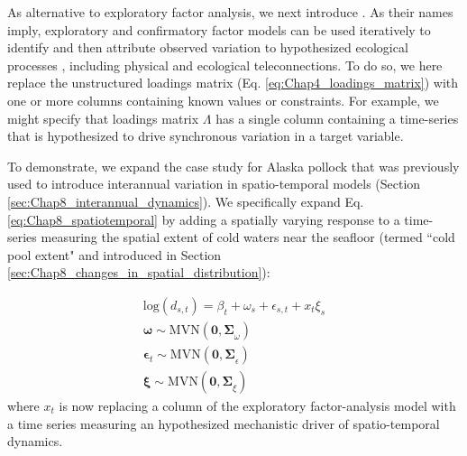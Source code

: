 As alternative to exploratory factor analysis, we next introduce .  As their names imply, exploratory and confirmatory factor models can be used iteratively to identify and then attribute observed variation to hypothesized ecological processes \cite{gruss_synthesis_2021,von_hardenberg_disentangling_2013}, including physical and ecological teleconnections.  To do so, we here replace the unstructured loadings matrix (Eq. \ref{eq:Chap4_loadings_matrix}) with one or more columns containing known values or constraints.  For example, we might specify that loadings matrix \( \Lambda \) has a single column containing a time-series that is hypothesized to drive synchronous variation in a target variable.  

To demonstrate, we expand the case study for Alaska pollock that was previously used to introduce interannual variation in spatio-temporal models (Section \ref{sec:Chap8_interannual_dynamics}). We specifically expand Eq. \ref{eq:Chap8_spatiotemporal} by adding a spatially varying response to a time-series measuring the spatial extent of cold waters near the seafloor (termed ``cold pool extent" and introduced in Section \ref{sec:Chap8_changes_in_spatial_distribution}): 

\begin{equation}
\begin{gathered} \label{eq:Chap9_confirmatory_factor_model}
  \mathrm{log}( d_{s,t} ) = \beta_t + \omega_s + \epsilon_{s,t} + x_t \xi_s \\
  \mathbf{\omega} \sim \mathrm{MVN}( \mathbf{0, \Sigma}_{\omega} ) \\
  \mathbf{\epsilon}_t \sim \mathrm{MVN}( \mathbf{0, \Sigma}_{\epsilon} ) \\
  \mathbf{\xi} \sim \mathrm{MVN}( \mathbf{0, \Sigma}_{\xi} ) 
\end{gathered}
\end{equation}
where \( x_t \) is now replacing a column of the exploratory factor-analysis model with a time series measuring an hypothesized mechanistic driver of spatio-temporal dynamics.  

